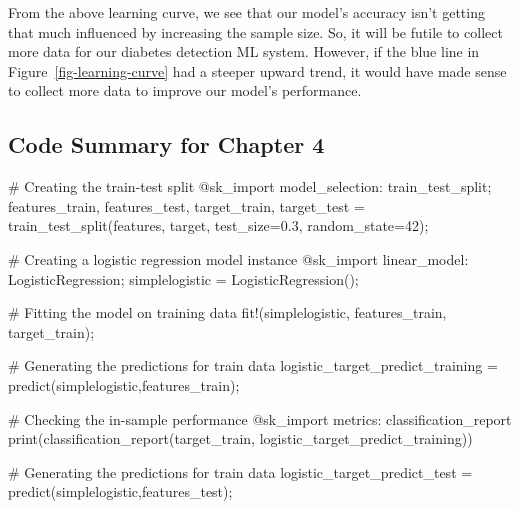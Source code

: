 \documentclass[
  letterpaper,
]{book}
\newenvironment{Shaded}{\begin{snugshade}}{\end{snugshade}}
\newcommand{\CommentTok}[1]{\textcolor[rgb]{0.37,0.37,0.37}{#1}}
\newcommand{\FloatTok}[1]{\textcolor[rgb]{0.68,0.00,0.00}{#1}}
\newcommand{\FunctionTok}[1]{\textcolor[rgb]{0.28,0.35,0.67}{#1}}
\newcommand{\NormalTok}[1]{\textcolor[rgb]{0.00,0.23,0.31}{#1}}
\newcommand{\OperatorTok}[1]{\textcolor[rgb]{0.37,0.37,0.37}{#1}}
\newcommand{\PreprocessorTok}[1]{\textcolor[rgb]{0.68,0.00,0.00}{#1}}
\begin{document}
From the above learning curve, we see that our model's accuracy isn't
getting that much influenced by increasing the sample size. So, it will
be futile to collect more data for our diabetes detection ML system.
However, if the blue line in Figure~\ref{fig-learning-curve} had a
steeper upward trend, it would have made sense to collect more data to
improve our model's performance.

\hypertarget{code-summary-for-chapter-4}{%
\subsection*{Code Summary for Chapter
4}\label{code-summary-for-chapter-4}}

\begin{Shaded}
\begin{Highlighting}[]
\CommentTok{\# Creating the train{-}test split}
\PreprocessorTok{@sk\_import}\NormalTok{ model\_selection}\OperatorTok{:}\NormalTok{ train\_test\_split;}
\NormalTok{features\_train, features\_test, }
\NormalTok{    target\_train, target\_test }\OperatorTok{=} \FunctionTok{train\_test\_split}\NormalTok{(features, }
\NormalTok{        target, test\_size}\OperatorTok{=}\FloatTok{0.3}\NormalTok{, random\_state}\OperatorTok{=}\FloatTok{42}\NormalTok{);}

\CommentTok{\# Creating a logistic regression model instance}
\PreprocessorTok{@sk\_import}\NormalTok{ linear\_model}\OperatorTok{:}\NormalTok{ LogisticRegression;}
\NormalTok{simplelogistic }\OperatorTok{=} \FunctionTok{LogisticRegression}\NormalTok{();}

\CommentTok{\# Fitting the model on training data}
\FunctionTok{fit!}\NormalTok{(simplelogistic, features\_train, target\_train);}

\CommentTok{\# Generating the predictions for train data  }
\NormalTok{logistic\_target\_predict\_training }\OperatorTok{=} 
    \FunctionTok{predict}\NormalTok{(simplelogistic,features\_train);}

\CommentTok{\# Checking the in{-}sample performance }
\PreprocessorTok{@sk\_import}\NormalTok{ metrics}\OperatorTok{:}\NormalTok{ classification\_report}
\FunctionTok{print}\NormalTok{(}\FunctionTok{classification\_report}\NormalTok{(target\_train,}
\NormalTok{                     logistic\_target\_predict\_training))}

\CommentTok{\# Generating the predictions for train data }
\NormalTok{logistic\_target\_predict\_test }\OperatorTok{=} 
    \FunctionTok{predict}\NormalTok{(simplelogistic,features\_test);}


\end{Highlighting}
\end{Shaded}
\end{document}
